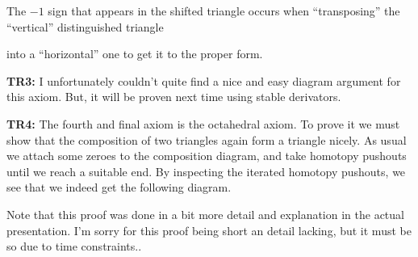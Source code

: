 The $-1$ sign that appears in the shifted triangle occurs when ``transposing'' the ``vertical'' distinguished triangle

\begin{center}
\end{center}

into a ``horizontal'' one to get it to the proper form. 


\textbf{TR3:} I unfortunately couldn't quite find a nice and easy diagram argument for this axiom. 
But, it will be proven next time using stable derivators. 


\textbf{TR4:} The fourth and final axiom is the octahedral axiom. 
To prove it we must show that the composition of two triangles again form a triangle nicely. 
As usual we attach some zeroes to the composition diagram, 
and take homotopy pushouts until we reach a suitable end. 
By inspecting the iterated homotopy pushouts, 
we see that we indeed get the following diagram.  

\begin{center}
\end{center}

Note that this proof was done in a bit more detail and explanation in the actual presentation. 
I'm sorry for this proof being short an detail lacking, 
but it must be so due to time constraints.. 